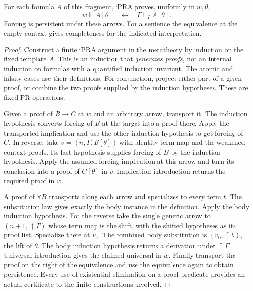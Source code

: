 \begin{theorem}\label{thm:syntacticforcing}
For each formula $A$ of this fragment, iPRA proves, uniformly in $w,\theta$,
\[
            w\Vdash A[\theta]\quad\longleftrightarrow\quad
            \Gamma\vdash_I A[\theta].
\]
Forcing is persistent under these arrows. For a sentence the equivalence at the empty context gives completeness for the indicated interpretation.
\end{theorem}
\begin{proof}
Construct a finite iPRA argument in the metatheory by induction on the fixed template $A$. This is an induction that \emph{generates proofs}, not an internal induction on formulas with a quantified induction invariant. The atomic and falsity cases use their definitions. For conjunction, project either part of a given proof, or combine the two proofs supplied by the induction hypotheses. These are fixed PR operations.

Given a proof of $B\to C$ at $w$ and an arbitrary arrow, transport it. The induction hypothesis converts forcing of $B$ at the target into a proof there. Apply the transported implication and use the other induction hypothesis to get forcing of $C$. In reverse, take $v=(n,\Gamma,B[\theta])$ with identity term map and the weakened context proofs. Its last hypothesis supplies forcing of $B$ by the induction hypothesis. Apply the assumed forcing implication at this arrow and turn its conclusion into a proof of $C[\theta]$ in $v$. Implication introduction returns the required proof in $w$.

A proof of $\forall B$ transports along each arrow and specializes to every term $t$. The substitution law gives exactly the body instance in the definition. Apply the body induction hypothesis. For the reverse take the single generic arrow to $(n+1,\uparrow\Gamma)$ whose term map is the shift, with the shifted hypotheses as its proof list. Specialize there at $v_0$. The combined body substitution is $(v_0,\uparrow\theta)$, the lift of $\theta$. The body induction hypothesis returns a derivation under $\uparrow\Gamma$. Universal introduction gives the claimed universal in $w$. Finally transport the proof on the right of the equivalence and use the equivalence again to obtain persistence. Every use of existential elimination on a proof predicate provides an actual certificate to the finite constructions involved.
\end{proof}

